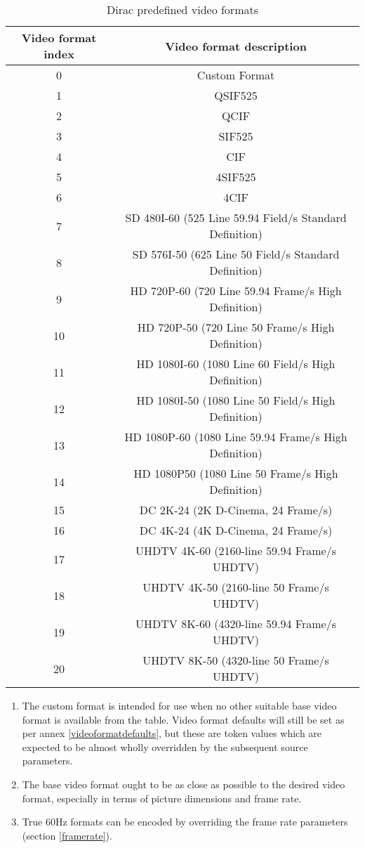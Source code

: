 \begin{table}[!ht]
\centering
\begin{tabular}{|c|c|}
\hline
\rowcolor[gray]{0.75}Video format index	& Video format description \\
\hline
0	& Custom Format\\
\hline
1	&	QSIF525\\
\hline
2	&	QCIF\\
\hline
3	&	SIF525\\
\hline
4	&	CIF\\
\hline
5	&	4SIF525\\
\hline
6	&	4CIF\\
\hline
7	&	SD 480I-60 (525 Line 59.94 Field/s Standard Definition)\\
\hline
8	&	SD 576I-50 (625 Line 50 Field/s Standard Definition)\\
\hline
9	&	HD 720P-60 (720 Line 59.94 Frame/s High Definition)\\
\hline
10 &	HD 720P-50 (720 Line 50 Frame/s High Definition)\\
\hline
11 &	HD 1080I-60 (1080 Line 60 Field/s High Definition)\\
\hline
12	&	HD 1080I-50 (1080 Line 50 Field/s High Definition)\\
\hline
13	&	HD 1080P-60 (1080 Line 59.94 Frame/s High Definition)\\
\hline
14	&	HD 1080P50 (1080 Line 50 Frame/s High Definition)\\
\hline
15	&	DC 2K-24 (2K D-Cinema, 24 Frame/s)\\
\hline
16	&	DC 4K-24 (4K D-Cinema, 24 Frame/s)\\
\hline
17	&	UHDTV 4K-60 (2160-line 59.94 Frame/s UHDTV)\\
\hline
18	&	UHDTV 4K-50 (2160-line 50 Frame/s UHDTV)\\
\hline
19	&	UHDTV 8K-60 (4320-line 59.94 Frame/s UHDTV)\\
\hline
20	&	UHDTV 8K-50 (4320-line 50 Frame/s UHDTV)\\
\hline
\end{tabular}
\caption{Dirac predefined video formats}
\label{table:videoformats}
\end{table}

\begin{informative}
\begin{enumerate}
\item The custom format is intended for use when no other suitable base video 
format is available from the table. Video format defaults will still be set as 
per annex \ref{videoformatdefaults}, but these are token values which are expected 
to be almost wholly overridden by the subsequent source parameters. 
\item The base video format ought to be as close as possible to the desired video
format, especially in terms of picture dimensions and frame rate.
\item True 60Hz formats can be encoded by overriding the frame rate parameters
(section \ref{framerate}).
 \end{enumerate}
\end{informative}

